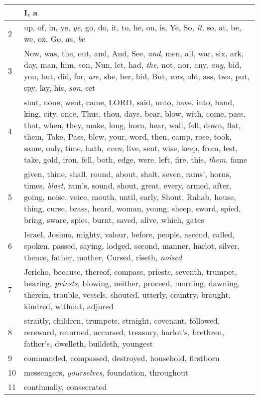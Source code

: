 \begin{longtable}{l|p{3.75in}}
\hline \hline
\endlastfoot
1 & I, a \\ \hline
2 & up, of, in, ye, \emph{ye}, go, do, it, to, he, on, is, Ye, So, \emph{it}, so, at, be, we, ox, Go, as, \emph{be} \\ \hline
3 & Now, was, the, out, and, And, See, \emph{and}, men, all, war, six, ark, day, man, him, son, Nun, let, had, \emph{the}, not, nor, any, \emph{any}, bid, you, but, did, for, \emph{are}, she, her, hid, But, \emph{was}, old, ass, two, put, spy, lay, his, \emph{son}, set \\ \hline
4 & shut, none, went, came, LORD, said, unto, have, into, hand, king, city, once, Thus, thou, days, bear, blow, with, come, pass, that, when, they, make, long, horn, hear, wall, fall, down, flat, them, Take, Pass, blew, your, word, then, camp, rose, took, same, only, time, hath, \emph{even}, live, sent, wise, keep, from, lest, take, gold, iron, fell, both, edge, were, left, fire, this, \emph{them}, fame \\ \hline
5 & given, thine, shall, round, about, shalt, seven, rams', horns, times, \emph{blast}, ram's, sound, shout, great, every, armed, after, going, noise, voice, mouth, until, early, Shout, Rahab, house, thing, curse, brass, heard, woman, young, sheep, sword, spied, bring, sware, spies, burnt, saved, alive, which, gates \\ \hline
6 & Israel, Joshua, mighty, valour, before, people, ascend, called, spoken, passed, saying, lodged, second, manner, harlot, silver, thence, father, mother, Cursed, riseth, \emph{noised} \\ \hline
7 & Jericho, because, thereof, compass, priests, seventh, trumpet, bearing, \emph{priests}, blowing, neither, proceed, morning, dawning, therein, trouble, vessels, shouted, utterly, country, brought, kindred, without, adjured \\ \hline
8 & straitly, children, trumpets, straight, covenant, followed, rereward, returned, accursed, treasury, harlot's, brethren, father's, dwelleth, buildeth, youngest \\ \hline
9 & commanded, compassed, destroyed, household, firstborn \\ \hline
10 & messengers, \emph{yourselves}, foundation, throughout \\ \hline
11 & continually, consecrated \\ \hline
\end{longtable}






